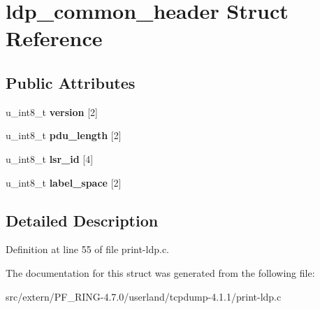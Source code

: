 \hypertarget{structldp__common__header}{
\section{ldp\_\-common\_\-header Struct Reference}
\label{structldp__common__header}
}
\subsection*{Public Attributes}
\begin{DoxyCompactItemize}
\item 
\hypertarget{structldp__common__header_a48045515f0a58904878ca1c73597884f}{
u\_\-int8\_\-t {\bfseries version} \mbox{[}2\mbox{]}}
\label{structldp__common__header_a48045515f0a58904878ca1c73597884f}

\item 
\hypertarget{structldp__common__header_a4a3236e058eba4bf30e59ace6102ba5b}{
u\_\-int8\_\-t {\bfseries pdu\_\-length} \mbox{[}2\mbox{]}}
\label{structldp__common__header_a4a3236e058eba4bf30e59ace6102ba5b}

\item 
\hypertarget{structldp__common__header_af6a9d4e8fe511decc135abb37d799866}{
u\_\-int8\_\-t {\bfseries lsr\_\-id} \mbox{[}4\mbox{]}}
\label{structldp__common__header_af6a9d4e8fe511decc135abb37d799866}

\item 
\hypertarget{structldp__common__header_aa7fd7171394b2fecb0ca5bc36170e7d7}{
u\_\-int8\_\-t {\bfseries label\_\-space} \mbox{[}2\mbox{]}}
\label{structldp__common__header_aa7fd7171394b2fecb0ca5bc36170e7d7}

\end{DoxyCompactItemize}


\subsection{Detailed Description}


Definition at line 55 of file print-\/ldp.c.



The documentation for this struct was generated from the following file:\begin{DoxyCompactItemize}
\item 
src/extern/PF\_\-RING-\/4.7.0/userland/tcpdump-\/4.1.1/print-\/ldp.c\end{DoxyCompactItemize}
